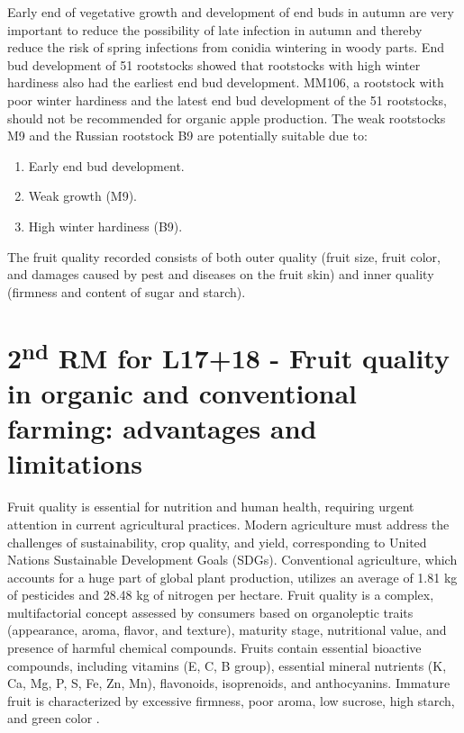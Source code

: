 \vspace{0.5em}
Early end of vegetative growth and development of end buds in autumn are very important to reduce the possibility of late infection in autumn and thereby reduce the risk of spring infections from conidia wintering in woody parts. End bud development of 51 rootstocks showed that rootstocks with high winter hardiness also had the earliest end bud development. MM106, a rootstock with poor winter hardiness and the latest end bud development of the 51 rootstocks, should not be recommended for organic apple production. The weak rootstocks M9 and the Russian rootstock B9 are potentially suitable due to: 

\begin{enumerate} 
    \item Early end bud development. 
    \item Weak growth (M9). 
    \item High winter hardiness (B9). 
\end{enumerate} 

\vspace{0.5em}
The fruit quality recorded consists of both outer quality (fruit size, fruit color, and damages caused by pest and diseases on the fruit skin) and inner quality (firmness and content of sugar and starch).


\section{\texorpdfstring{2\textsuperscript{nd} RM for L17+18 - Fruit quality in organic and conventional farming: advantages and limitations}{2nd RM for L17+18 - Fruit quality in organic and conventional farming: advantages and limitations}}

Fruit quality is essential for nutrition and human health, requiring urgent attention in current agricultural practices. Modern agriculture must address the challenges of sustainability, crop quality, and yield, corresponding to United Nations Sustainable Development Goals (SDGs). Conventional agriculture, which accounts for a huge part of global plant production, utilizes an average of 1.81 kg of pesticides and 28.48 kg of nitrogen per hectare. Fruit quality is a complex, multifactorial concept assessed by consumers based on organoleptic traits (appearance, aroma, flavor, and texture), maturity stage, nutritional value, and presence of harmful chemical compounds. Fruits contain essential bioactive compounds, including vitamins (E, C, B group), essential mineral nutrients (K, Ca, Mg, P, S, Fe, Zn, Mn), flavonoids, isoprenoids, and anthocyanins. Immature fruit is characterized by excessive firmness, poor aroma, low sucrose, high starch, and green color \cite*{rm_10.2_L17-18_sustainable_production_organic_apple_production}.

